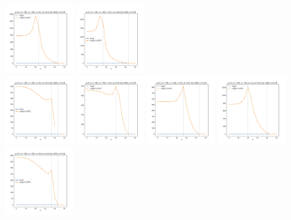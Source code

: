 \documentclass[a4paper]{article}
\begin{document}
\begin{figure}[H]
  \includegraphics[width=0.23\textwidth]{grid-g5-v4-w3_0}
  \includegraphics[width=0.23\textwidth]{grid-g5-v4-w4_0}
  \\
  \includegraphics[width=0.23\textwidth]{grid-g5-v5-w1_0}
  \includegraphics[width=0.23\textwidth]{grid-g5-v5-w2_0}
  \includegraphics[width=0.23\textwidth]{grid-g5-v5-w3_0}
  \includegraphics[width=0.23\textwidth]{grid-g5-v5-w4_0}
  \\
  \includegraphics[width=0.23\textwidth]{grid-g5-v6-w1_0}

\end{figure}
\end{document}

